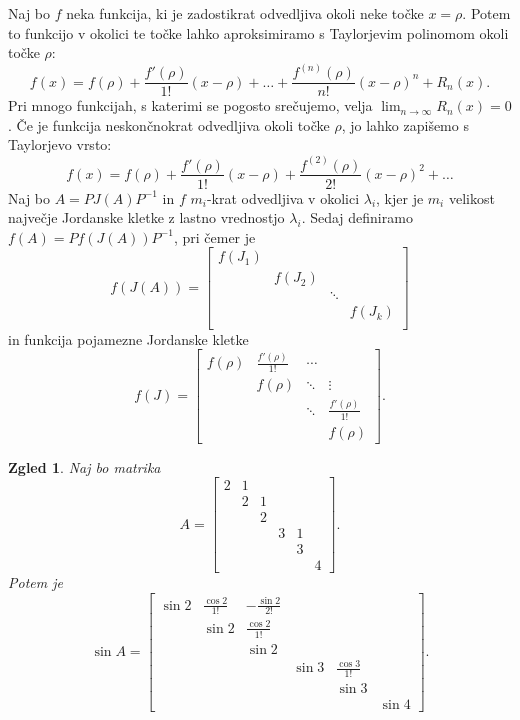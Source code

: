 \documentclass[10pt, a4paper]{article}
\newtheorem{zgled}{Zgled}[section]
\begin{document}
Naj bo $f$ neka funkcija, ki je zadostikrat odvedljiva okoli neke točke $x = \rho$.
Potem to funkcijo v okolici te točke lahko aproksimiramo s Taylorjevim polinomom okoli točke $\rho$:
$$f(x) = f(\rho) + \frac{f'(\rho)}{1!} (x-\rho) + \dots + \frac{f^{(n)}(\rho)}{n!} (x-\rho)^n + R_n (x).$$
Pri mnogo funkcijah, s katerimi se pogosto srečujemo, velja $\lim_{n \to \infty} R_n(x) = 0$.
Če je funkcija neskončnokrat odvedljiva okoli točke $\rho$, jo lahko zapišemo s Taylorjevo vrsto: 
$$f(x) = f(\rho) + \frac{f'(\rho)}{1!} (x-\rho) + \frac{f^{(2)}(\rho)}{2!} (x-\rho)^2 + \dots$$
Naj bo $A = P J(A) P^{-1}$ in $f$ $m_i$-krat odvedljiva v okolici $\lambda_i$, kjer je $m_i$ velikost največje Jordanske kletke z lastno vrednostjo $\lambda_i$.
Sedaj definiramo $f(A) = P f(J(A)) P^{-1}$, pri čemer je 
$$f(J(A)) = \begin{bmatrix}
    f(J_1) & & & \\
    & f(J_2) & & \\
    & & \ddots & \\
    & & & f(J_k)\\
\end{bmatrix}$$ 
in funkcija pojamezne Jordanske kletke 
$$f(J) = \begin{bmatrix}
    f(\rho) & \frac{f'(\rho)}{1!} & \cdots & \\
    & f(\rho) & \ddots & \vdots\\
    & & \ddots & \frac{f'(\rho)}{1!} \\
    & & & f(\rho)
\end{bmatrix}.$$

\begin{zgled}
    Naj bo matrika $$A = \begin{bmatrix}
        2 & 1 & & & & \\
        & 2 & 1 & & & \\
        & & 2 & & & \\
        & & & 3 & 1 & \\
        & & & & 3 & \\
        & & & & & 4
    \end{bmatrix}.$$ Potem je
    $$\sin A = \begin{bmatrix}
        \sin 2 & \frac{\cos 2}{1!} & -\frac{\sin 2}{2!} & & & \\
        & \sin 2 & \frac{\cos 2}{1!} & & & \\
        & & \sin 2 & & & \\
        & & & \sin 3 & \frac{\cos 3}{1!} & \\
        & & & & \sin 3 & \\
        & & & & & \sin 4
    \end{bmatrix}.$$ 
\end{zgled}
\clearpage
\end{document}

